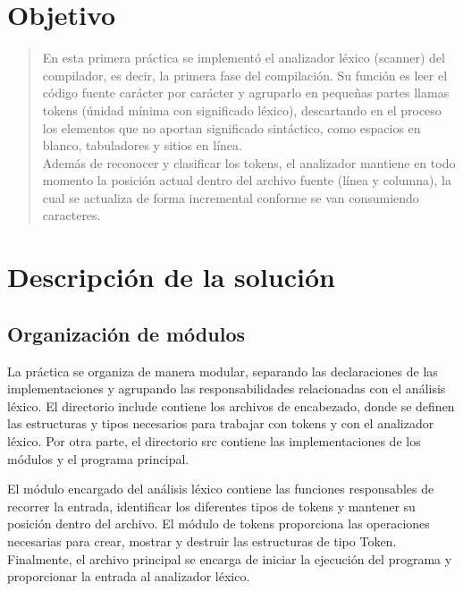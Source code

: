 \documentclass[12pt,letterpaper]{article}
\begin{document}
\thispagestyle{empty}


\newpage

\section*{Objetivo}

\begin{quote}
 En esta primera práctica se implementó el analizador léxico (scanner) del compilador, es decir, la primera fase del compilación. Su función es leer el código fuente carácter por carácter y agruparlo en pequeñas partes llamas tokens (únidad mínima con significado léxico), descartando en el proceso los elementos que no aportan significado sintáctico, como espacios en blanco, tabuladores y sitios en línea.\\
  Además de reconocer y clasificar los tokens, el analizador mantiene en todo momento la posición actual dentro del archivo fuente (línea y columna), la cual se actualiza de forma incremental conforme se van consumiendo caracteres.
\end{quote}

\section*{Descripción de la solución}

\subsection*{Organización de módulos}

La práctica se organiza de manera modular, separando las declaraciones de las implementaciones y agrupando las responsabilidades relacionadas con el análisis léxico. El directorio include contiene los archivos de encabezado, donde se definen las estructuras y tipos necesarios para trabajar con tokens y con el analizador léxico. Por otra parte, el directorio src contiene las implementaciones de los módulos y el programa principal.

El módulo encargado del análisis léxico contiene las funciones responsables de recorrer la entrada, identificar los diferentes tipos de tokens y mantener su posición dentro del archivo. El módulo de tokens proporciona las operaciones necesarias para crear, mostrar y destruir las estructuras de tipo Token. Finalmente, el archivo principal se encarga de iniciar la ejecución del programa y proporcionar la entrada al analizador léxico.
\end{document}
